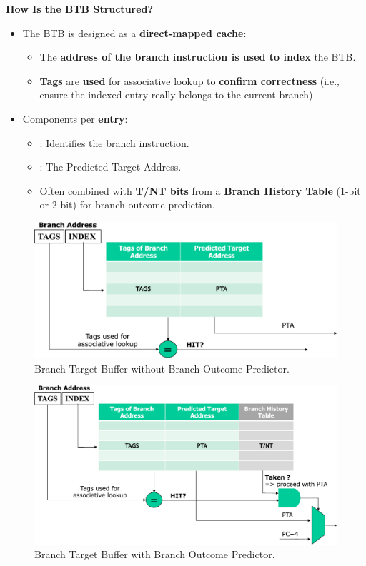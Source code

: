 \highspace
\begin{flushleft}
    \textcolor{Green3}{ \textbf{How Is the BTB Structured?}}
\end{flushleft}
\begin{itemize}
    \item The BTB is designed as a \textbf{direct-mapped cache}:
    \begin{itemize}
        \item The \textbf{address of the branch instruction is used to index} the BTB.
        \item \textbf{Tags} are \textbf{used} for associative lookup to \textbf{confirm correctness} (i.e., ensure the indexed entry really belongs to the current branch)
    \end{itemize}
    \item Components per \textbf{entry}:
    \begin{itemize}
        \item {}: Identifies the branch instruction.
        \item {}: The Predicted Target Address.
        \item Often combined with \textbf{T/NT bits} from a \textbf{Branch History Table} (1-bit or 2-bit) for branch outcome prediction.
    \end{itemize}
\end{itemize}
\begin{figure}[!htp]
    \centering
    \includegraphics[width=\textwidth]{img/btb.pdf}
    \caption{Branch Target Buffer without Branch Outcome Predictor.}
\end{figure}

\newpage

\begin{figure}[!htp]
    \centering
    \includegraphics[width=\textwidth]{img/btb-bht.pdf}
    \caption{Branch Target Buffer with Branch Outcome Predictor.}
\end{figure}

